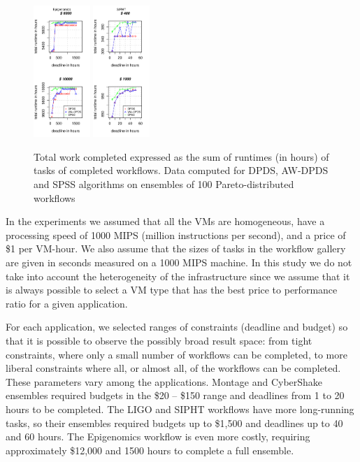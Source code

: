 \documentclass{sig-alternate}
\begin{document}
\begin{figure}[t]
\includegraphics[width=0.19\textwidth]{figures/pareto-size-GENOME-n-1000-8-dagh100-1500m0.pdf}
\includegraphics[width=0.19\textwidth]{figures/pareto-size-SIPHT-n-1000-8-dagh5-50m0.pdf}
\caption{ Total work completed expressed as the sum of runtimes (in hours) of
tasks of completed workflows. Data computed for DPDS, AW-DPDS and SPSS
algorithms on ensembles of 100 Pareto-distributed workflows}
\label{fig:total-time}
\end{figure}

In the experiments we assumed that all the VMs are homogeneous, have a
processing speed of 1000 MIPS (million instructions per second), and a price of
\$1 per VM-hour. We also assume that the sizes of tasks in the workflow gallery 
are given in seconds measured on a 1000 MIPS machine. In this study we do not 
take into account the heterogeneity of the infrastructure since we assume that 
it is always possible to select a VM type that has the best price to performance 
ratio for a given application.

For each application, we selected ranges of constraints (deadline and budget) so
that it is possible to observe the possibly broad result space: from tight 
constraints, where only a small number of workflows can be completed, to 
more liberal constraints where all, or almost all, of the workflows can be 
completed. These parameters vary among the applications. Montage and CyberShake 
ensembles required budgets in the \$20 -- \$150 range and deadlines from 1 to
20 hours to be completed. The LIGO and SIPHT workflows have more long-running
tasks, so their ensembles required budgets up to \$1,500 and deadlines up to 
40 and 60 hours. The Epigenomics workflow is even more costly, requiring 
approximately \$12,000 and 1500 hours to complete a full ensemble.
\end{document}
